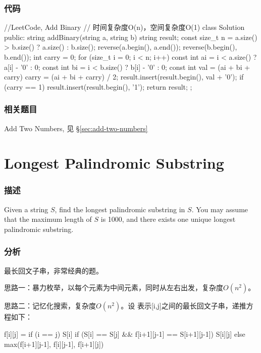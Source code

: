 \subsubsection{代码}
\begin{Code}
//LeetCode, Add Binary
// 时间复杂度O(n)，空间复杂度O(1)
class Solution {
public:
    string addBinary(string a, string b) {
        string result;
        const size_t n = a.size() > b.size() ? a.size() : b.size();
        reverse(a.begin(), a.end());
        reverse(b.begin(), b.end());
        int carry = 0;
        for (size_t i = 0; i < n; i++) {
            const int ai = i < a.size() ? a[i] - '0' : 0;
            const int bi = i < b.size() ? b[i] - '0' : 0;
            const int val = (ai + bi + carry) %
            carry = (ai + bi + carry) / 2;
            result.insert(result.begin(), val + '0');
        }
        if (carry == 1) {
            result.insert(result.begin(), '1');
        }
        return result;
    }
};
\end{Code}


\subsubsection{相关题目}
\begindot
\item Add Two Numbers, 见 \S \ref{sec:add-two-numbers}
\myenddot


\section{Longest Palindromic Substring} %
\label{sec:longest-palindromic-substring}


\subsubsection{描述}
Given a string $S$, find the longest palindromic substring in $S$. You may assume that the maximum length of $S$ is 1000, and there exists one unique longest palindromic substring.


\subsubsection{分析}
最长回文子串，非常经典的题。

思路一：暴力枚举，以每个元素为中间元素，同时从左右出发，复杂度$O(n^2)$。

思路二：记忆化搜索，复杂度$O(n^2)$。设 表示[i,j]之间的最长回文子串，递推方程如下：
\begin{Code}
f[i][j] = if (i == j) S[i]
          if (S[i] == S[j] && f[i+1][j-1] == S[i+1][j-1]) S[i][j]
          else max(f[i+1][j-1], f[i][j-1], f[i+1][j])
\end{Code}

